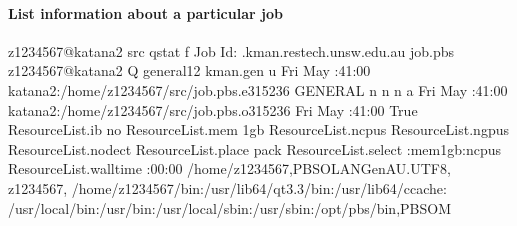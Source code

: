 \documentclass[letterpaper,10pt,english]{sphinxmanual}
\begin{document}
\paragraph{List information about a particular job}
\label{\detokenize{using_katana/running_jobs:list-information-about-a-particular-job}}
\begin{sphinxVerbatim}[commandchars=\\\{\}]
\PYG{o}{[}z1234567@katana2 src\PYG{o}{]}\PYGZdl{} qstat \PYGZhy{}f 
Job Id: .kman.restech.unsw.edu.au
      job.pbs
      z1234567@katana2
      Q
      general12
      kman.gen
      u
      Fri May   :41:00 
      katana2:/home/z1234567/src/job.pbs.e315236
      GENERAL
      n
      n
      n
      a
      Fri May   :41:00 
      katana2:/home/z1234567/src/job.pbs.o315236
      
      Fri May   :41:00 
      True
    Resource\PYGZus{}List.ib  no
    Resource\PYGZus{}List.mem  1gb
    Resource\PYGZus{}List.ncpus  
    Resource\PYGZus{}List.ngpus  
    Resource\PYGZus{}List.nodect  
    Resource\PYGZus{}List.place  pack
    Resource\PYGZus{}List.select  :mem1gb:ncpus
    Resource\PYGZus{}List.walltime  :00:00
      
      /home/z1234567,PBS\PYGZus{}O\PYGZus{}LANGen\PYGZus{}AU.UTF\PYGZhy{}8,
        z1234567,
        /home/z1234567/bin:/usr/lib64/qt\PYGZhy{}3.3/bin:/usr/lib64/ccache:
        /usr/local/bin:/usr/bin:/usr/local/sbin:/usr/sbin:/opt/pbs/bin,PBS\PYGZus{}O\PYGZus{}M

\end{sphinxVerbatim}
\end{document}
